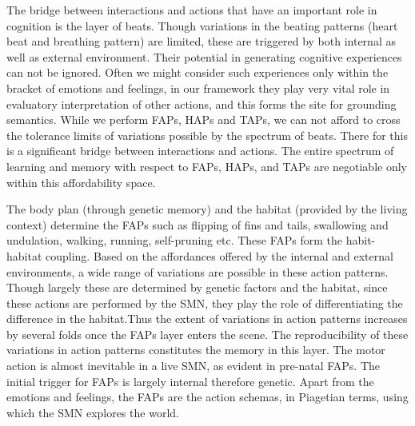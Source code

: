The bridge between interactions and actions that have an important role in cognition is the layer of beats. Though variations in the beating patterns (heart beat and breathing pattern) are limited, these are triggered by both internal as well as external environment. Their potential in generating cognitive experiences can not be ignored. Often we might consider such experiences only within the bracket of emotions and feelings, in our framework they play very vital role in evaluatory interpretation of other actions, and this forms the site for grounding semantics. While we perform FAPs, HAPs and TAPs, we can not afford to cross the tolerance limits of variations possible by the spectrum of beats. There for this is a significant bridge between interactions and actions. The entire spectrum of learning and memory with respect to FAPs, HAPs, and TAPs are negotiable only within this affordability space. 

The body plan (through genetic memory) and the habitat (provided by the living context) determine the FAPs such as flipping of fins and tails, swallowing and undulation, walking, running, self-pruning etc. These FAPs form the habit-habitat coupling. Based on the affordances offered by the internal and external environments, a wide range of variations are possible in these action patterns. Though largely these are determined by genetic factors and the habitat, since these actions are performed by the SMN, they play the role of differentiating the difference in the habitat.Thus the extent of variations in action patterns increases by several folds once the FAPs layer enters the scene. The reproducibility of these variations in action patterns constitutes the memory in this layer. The motor action is almost inevitable in a live SMN, as evident in pre-natal FAPs. The initial trigger for FAPs is largely internal therefore genetic. Apart from the emotions and feelings, the FAPs are the action schemas, in Piagetian terms, using which the SMN explores the world. 

